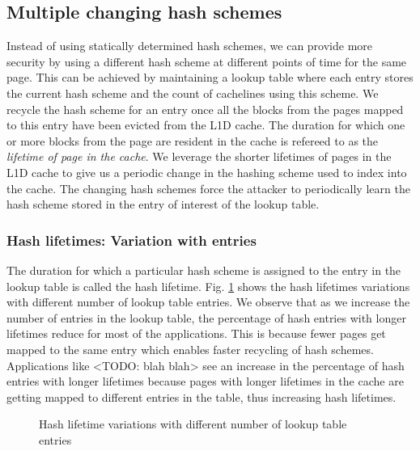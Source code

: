 \subsection{Multiple changing hash schemes}
Instead of using statically determined hash schemes, we can provide more security by using a different hash scheme at different points of time for the same page. This can be achieved by maintaining a lookup table where each entry stores the current hash scheme and the count of cachelines using this scheme. We recycle the hash scheme for an entry once all the blocks from the pages mapped to this entry have been evicted from the L1D cache. The duration for which one or more blocks from the page are resident in the cache is refereed to as the \textit{lifetime of page in the cache}. We leverage the shorter lifetimes of pages in the L1D cache to give us a periodic change in the hashing scheme used to index into the cache. The changing hash schemes force the attacker to periodically learn the hash scheme stored in the entry of interest of the lookup table.

\subsubsection{Hash lifetimes: Variation with entries}
The duration for which a particular hash scheme is assigned to the entry in the lookup table is called the hash lifetime. Fig. \ref{figure:Hash_lifetime} shows the hash lifetimes variations with different number of lookup table entries. We observe that as we increase the number of entries in the lookup table, the percentage of hash entries with longer lifetimes reduce for most of the applications. This is because fewer pages get mapped to the same entry which enables faster recycling of hash schemes. Applications like <TODO: blah blah> see an increase in the percentage of hash entries with longer lifetimes because pages with longer lifetimes in the cache are getting mapped to different entries in the table, thus increasing hash lifetimes.
\begin{figure}
  \caption{Hash lifetime variations with different number of lookup table entries}
  \label{figure:Hash_lifetime}
\end{figure}

